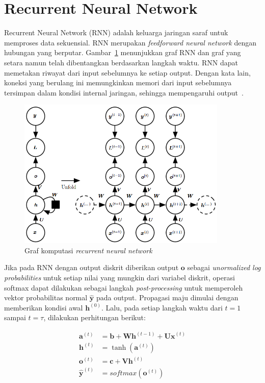 \section{Recurrent Neural Network}
Recurrent Neural Network (RNN) adalah keluarga jaringan saraf untuk memproses data sekuensial. RNN merupakan \textit{feedforward neural network} dengan hubungan yang berputar. Gambar~\ref{gambar:rnn} menunjukkan graf RNN dan graf yang setara namun telah dibentangkan berdasarkan langkah waktu. RNN dapat memetakan riwayat dari input sebelumnya ke setiap output. Dengan kata lain, koneksi yang berulang ini memungkinkan memori dari input sebelumnya tersimpan dalam kondisi internal jaringan, sehingga mempengaruhi output~\citep{graves-2012}.

\begin{figure}
    \centering
    \includegraphics[width=10cm]{gambar/landasan-teori/rnn.png}
    \caption{Graf komputasi \textit{recurrent neural network} \citep{goodfellow-2016}}
    \label{gambar:rnn}
\end{figure}

Jika pada RNN dengan output diskrit diberikan output $\pmb{o}$ sebagai \textit{unormalized log probabilities} untuk setiap nilai yang mungkin dari variabel diskrit, operasi softmax dapat dilakukan sebagai langkah \textit{post-processing} untuk memperoleh vektor probabilitas normal $\pmb{\hat{y}}$ pada output. Propagasi maju dimulai dengan memberikan kondisi awal $\pmb{h}^{(0)}$. Lalu, pada setiap langkah waktu dari $t = 1$ sampai $t = \tau$, dilakukan perhitungan berikut:

\begin{align}
    \pmb{a}^{(t)} &= \pmb{b} + \pmb{Wh}^{(t-1)} + \pmb{Ux}^{(t)} \\
    \pmb{h}^{(t)} &= \tanh(\pmb{a}^{(t)}) \\
    \pmb{o}^{(t)} &= \pmb{c} + \pmb{Vh}^{(t)} \\
    \pmb{\hat{y}}^{(t)} &= softmax(\pmb{o}^{(t)})
\end{align}

